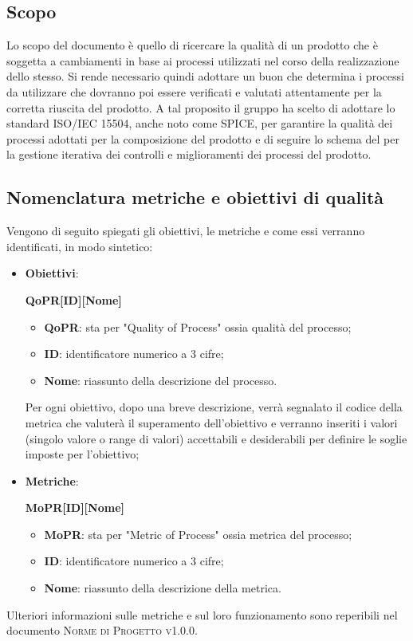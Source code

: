 \documentclass[../piano-di-qualifica.tex]{subfiles}
\begin{document}
\subsection{Scopo}%
\label{sub:scopo}
Lo scopo del documento è quello di ricercare la qualità di un prodotto che è soggetta a cambiamenti in base ai processi utilizzati nel corso della realizzazione dello stesso.
Si rende necessario quindi adottare un buon  che determina i processi da utilizzare che dovranno poi essere verificati e valutati attentamente per la corretta riuscita del prodotto.
A tal proposito il gruppo ha scelto di adottare lo standard ISO/IEC 15504, anche noto come SPICE, per garantire la qualità dei processi adottati per la composizione del prodotto e di seguire lo schema del  per la gestione iterativa dei controlli e miglioramenti dei processi del prodotto.

\subsection{Nomenclatura metriche e obiettivi di qualità}%
\label{sub:nomenclatura_metriche_e_obiettivi_di_qualita}
Vengono di seguito spiegati gli obiettivi, le metriche e come essi verranno identificati, in modo sintetico:
\begin{itemize}
    \item \textbf{Obiettivi}: 
    \begin{center}
        \centering
        \textbf{QoPR[ID][Nome]}
    \end{center}
        \begin{itemize}
            \item \textbf{QoPR}: sta per "Quality of Process" ossia qualità del processo;
            \item \textbf{ID}: identificatore numerico a 3 cifre;
            \item \textbf{Nome}: riassunto della descrizione del processo.
        \end{itemize}
        Per ogni obiettivo, dopo una breve descrizione, verrà segnalato il codice della metrica che valuterà il superamento dell'obiettivo e verranno inseriti i valori (singolo valore o range di valori) accettabili e desiderabili per definire le soglie imposte per l'obiettivo;
    \item \textbf{Metriche}: 
    \begin{center}
        \centering
        \textbf{MoPR[ID][Nome]}
    \end{center}
        \begin{itemize}
            \item \textbf{MoPR}: sta per "Metric of Process" ossia metrica del processo;
            \item \textbf{ID}: identificatore numerico a 3 cifre;
            \item \textbf{Nome}: riassunto della descrizione della metrica.
        \end{itemize}
\end{itemize}  
Ulteriori informazioni sulle metriche e sul loro funzionamento sono reperibili nel documento \textsc{Norme di Progetto v1.0.0}.
\end{document}
